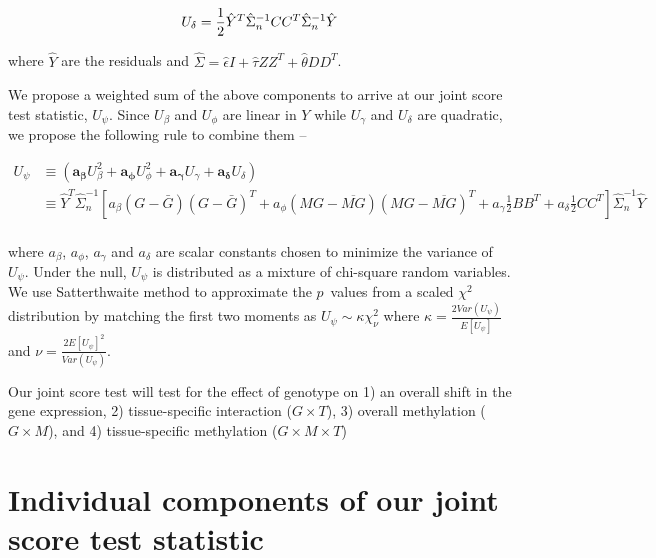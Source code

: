 \documentclass[hidelinks]{article}
\begin{document}
\begingroup
\large
\begin{equation*}
U_\delta = \frac{1}{2} \hat{Y}^T \hat{\Sigma}_n^{-1} CC^T \hat{\Sigma}_n^{-1} \hat{Y}\\
\end{equation*}
\endgroup

where $\hat{Y}$ are the residuals and $\hat{\Sigma} = \hat{\epsilon} I + \hat{\tau}ZZ^T + \hat{\theta}DD^T$.

We propose a weighted sum of the above components to arrive at our joint score test statistic, $U_\psi$. Since $U_\beta$ and $U_\phi$ are linear in $Y$ while $U_\gamma$ and $U_\delta$ are quadratic, we propose the following rule to combine them --	

\begingroup
\large
\begin{equation}
\begin{split}
U_\psi &\equiv  \left( \boldsymbol{a_\beta} U^2_\beta + \boldsymbol{a_\phi} U^2_\phi + \boldsymbol{a_\gamma} U_\gamma + \boldsymbol{a_\delta} U_\delta  \right) \\
 &\equiv \hat{Y}^T  \hat{\Sigma}_n^{-1} \left[ a_\beta \left(G - \bar{G}\right) \left(G - \bar{G}\right)^T  + a_\phi \left(MG - \overline{MG}\right) \left(MG - \overline{MG}\right)^T  + a_\gamma \frac{1}{2} B B^T + a_\delta \frac{1}{2} C C^T  \right]  \hat{\Sigma}_n^{-1} \hat{Y} \\
\end{split}
\end{equation}
\endgroup

where $a_\beta$, $a_\phi$, $a_\gamma$ and $a_\delta$ are scalar constants chosen to minimize the variance of $U_\psi$. Under the null, $U_\psi$ is distributed as a mixture of chi-square random variables. We use Satterthwaite method \cite{satterthwaite} to approximate the $p$~values from a scaled $\chi^2$ distribution by matching the first two moments as $U_\psi \sim \kappa \chi^2_{\nu}$ where $\kappa = \frac{2 Var(U_\psi)}{E[U_\psi]}$ and $\nu = \frac{2 E[U_\psi]^2}{Var(U_\psi)}$. 

Our joint score test will test for the effect of genotype on 1) an overall shift in the gene expression, 2) tissue-specific interaction ($G \times T$), 3) overall methylation ($G \times M$), and 4) tissue-specific methylation ($G \times M \times T$)

\section{Individual components of our joint score test statistic}
\end{document}
